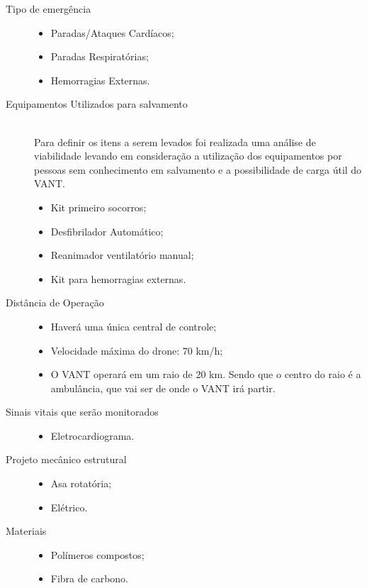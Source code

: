 \begin{description}
\begin{itemize}
  	\end{itemize}
  \item[Tipo de emergência] \hfill 
  	\begin{itemize}
  		\item Paradas/Ataques Cardíacos;
		\item Paradas Respiratórias;
		\item Hemorragias Externas.
  	\end{itemize}
  \item[Equipamentos Utilizados para salvamento] \hfill \\
  	Para definir os itens a serem levados foi realizada uma análise de viabilidade levando em consideração a utilização dos equipamentos por pessoas sem conhecimento em salvamento e a possibilidade de carga útil do VANT.
  	\begin{itemize}
  		\item Kit primeiro socorros;
		\item Desfibrilador Automático;
		\item Reanimador ventilatório manual;
		\item Kit para hemorragias externas.
  	\end{itemize}
  \item[Distância de Operação] \hfill 
  	\begin{itemize}
  		\item Haverá uma única central de controle;
  		\item Velocidade máxima do drone: 70 km/h;
  		\item O VANT operará em um raio de 20 km. Sendo que o centro do raio é a ambulância, que vai ser de onde o VANT irá partir.
  	\end{itemize}
  \item[Sinais vitais que serão monitorados] \hfill 
  	\begin{itemize}
  		\item Eletrocardiograma.
  	\end{itemize}
  \item[Projeto mecânico estrutural] \hfill 
  	\begin{itemize}
  		\item Asa rotatória;
		\item Elétrico.
  	\end{itemize}
  \item[Materiais] \hfill 
  	\begin{itemize}
  		\item Polímeros compostos;
		\item Fibra de carbono.

\end{itemize}
\end{description}
